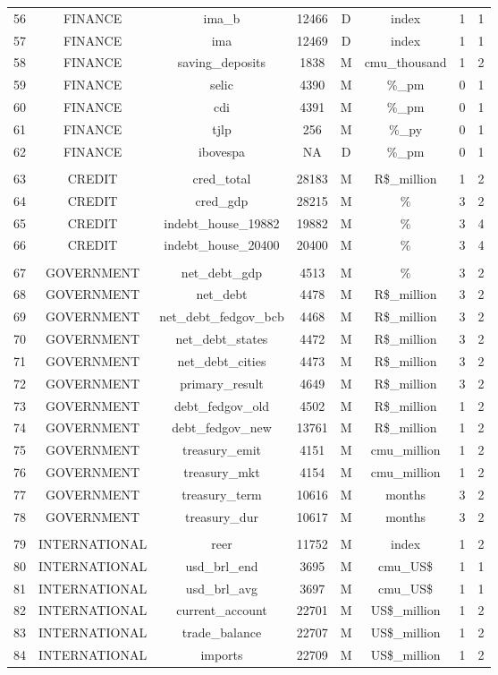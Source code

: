 \documentclass[12pt,openright,twoside,a4paper,brazil,english,emptypage,openany]{abntex2}
\begin{document}
\begin{table}[!htbp]
{\begin{tabular}{@{\extracolsep{5pt}} cccccccc}
56 & FINANCE & ima\_b & 12466 & D & index & 1 & 1 \\ 
57 & FINANCE & ima & 12469 & D & index & 1 & 1 \\ 
58 & FINANCE & saving\_deposits & 1838 & M & cmu\_thousand & 1 & 2 \\ 
59 & FINANCE & selic & 4390 & M & \%\_pm & 0 & 1 \\ 
60 & FINANCE & cdi & 4391 & M & \%\_pm & 0 & 1 \\ 
61 & FINANCE & tjlp & 256 & M & \%\_py & 0 & 1 \\ 
62 & FINANCE & ibovespa & NA & D & \%\_pm & 0 & 1 \\ 
\hline \\[-1.8ex]
63 & CREDIT & cred\_total & 28183 & M & R\$\_million & 1 & 2 \\ 
64 & CREDIT & cred\_gdp & 28215 & M & \% & 3 & 2 \\ 
65 & CREDIT & indebt\_house\_19882 & 19882 & M & \% & 3 & 4 \\ 
66 & CREDIT & indebt\_house\_20400 & 20400 & M & \% & 3 & 4 \\ 
\hline \\[-1.8ex]
67 & GOVERNMENT & net\_debt\_gdp & 4513 & M & \% & 3 & 2 \\ 
68 & GOVERNMENT & net\_debt & 4478 & M & R\$\_million & 3 & 2 \\ 
69 & GOVERNMENT & net\_debt\_fedgov\_bcb & 4468 & M & R\$\_million & 3 & 2 \\ 
70 & GOVERNMENT & net\_debt\_states & 4472 & M & R\$\_million & 3 & 2 \\ 
71 & GOVERNMENT & net\_debt\_cities & 4473 & M & R\$\_million & 3 & 2 \\ 
72 & GOVERNMENT & primary\_result & 4649 & M & R\$\_million & 3 & 2 \\ 
73 & GOVERNMENT & debt\_fedgov\_old & 4502 & M & R\$\_million & 1 & 2 \\ 
74 & GOVERNMENT & debt\_fedgov\_new & 13761 & M & R\$\_million & 1 & 2 \\ 
75 & GOVERNMENT & treasury\_emit & 4151 & M & cmu\_million & 1 & 2 \\ 
76 & GOVERNMENT & treasury\_mkt & 4154 & M & cmu\_million & 1 & 2 \\ 
77 & GOVERNMENT & treasury\_term & 10616 & M & months & 3 & 2 \\ 
78 & GOVERNMENT & treasury\_dur & 10617 & M & months & 3 & 2 \\ 
\hline \\[-1.8ex]
79 & INTERNATIONAL & reer & 11752 & M & index & 1 & 2 \\ 
80 & INTERNATIONAL & usd\_brl\_end & 3695 & M & cmu\_US\$ & 1 & 1 \\ 
81 & INTERNATIONAL & usd\_brl\_avg & 3697 & M & cmu\_US\$ & 1 & 1 \\ 
82 & INTERNATIONAL & current\_account & 22701 & M & US\$\_million & 1 & 2 \\ 
83 & INTERNATIONAL & trade\_balance & 22707 & M & US\$\_million & 1 & 2 \\ 
84 & INTERNATIONAL & imports & 22709 & M & US\$\_million & 1 & 2 \\ 



\end{tabular}}
\end{table}
\end{document}
